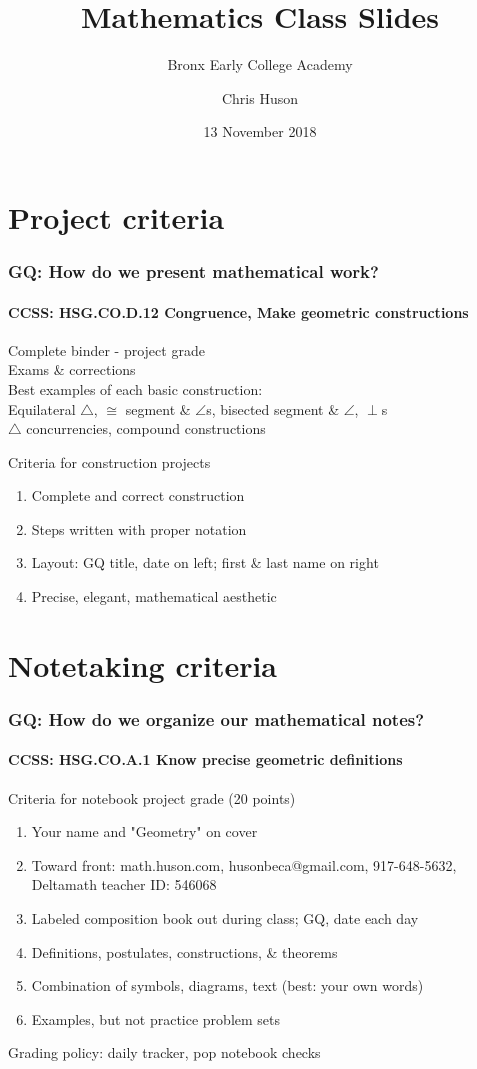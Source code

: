 \documentclass{beamer}
\title{Mathematics Class Slides}
\subtitle{Bronx Early College Academy}
\author{Chris Huson}
\date{13 November 2018}
\begin{document}
\frame{\titlepage}
\section[Outline]{}
\frame{\tableofcontents}

\section{Project criteria}
  \frame
  {
    \frametitle{GQ: How do we present mathematical work?}
    \framesubtitle{CCSS: HSG.CO.D.12 Congruence, Make geometric constructions}

    Complete binder - \alert{project grade}\\
    Exams \& corrections\\
    Best examples of each basic construction:\\
    Equilateral $\triangle$, $\cong$ segment \& $\angle$s, bisected segment \& $\angle$, $\perp$s \\
    $\triangle$ concurrencies, compound constructions
      \begin{block}{Criteria for construction projects}
      \begin{enumerate}
          \item Complete and correct construction
          \item Steps written with proper notation
          \item Layout: GQ title, date on left; first \& last name on right
          \item Precise, elegant, mathematical aesthetic
      \end{enumerate}
      \end{block}
  }

\section{Notetaking criteria}
  \frame
  {
    \frametitle{GQ: How do we organize our mathematical notes?}
    \framesubtitle{CCSS: HSG.CO.A.1 Know precise geometric definitions}

    \begin{block}{Criteria for notebook project grade (20 points)}
    \begin{enumerate}
      \item Your name and "Geometry" on cover
      \item Toward front: math.huson.com, husonbeca@gmail.com, 917-648-5632, Deltamath teacher ID: 546068
      \item Labeled composition book out during class; GQ, date each day
      \item Definitions, postulates, constructions, \& theorems
      \item Combination of symbols, diagrams, text (best: your own words)
      \item Examples, but not practice problem sets
    \end{enumerate}
    \end{block}
    Grading policy: daily tracker, pop notebook checks
  }
\end{document}
